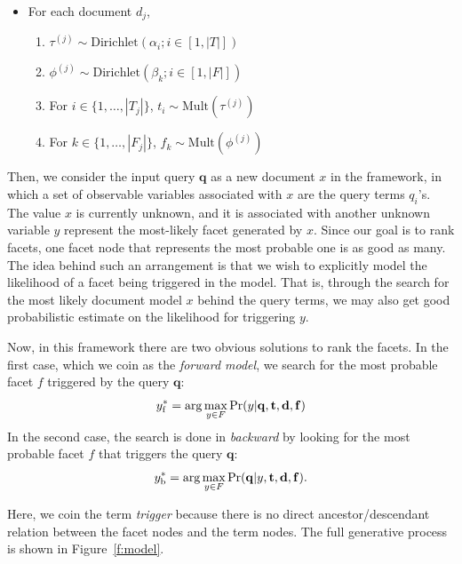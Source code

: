 \begin{itemize} 
  \item For each document $d_j$, \begin{enumerate}
    \item $\tau^{(j)} \sim \textrm{Dirichlet}(\alpha_i; i \in [1, |T|])$
    \item $\phi^{(j)} \sim \textrm{Dirichlet}(\beta_k; i \in [1, |F|])$
    \item For $i \in \{ 1, \ldots, |T_j| \}$, $t_i \sim \textrm{Mult}(\tau^{(j)})$ 
    \item For $k \in \{ 1, \ldots, |F_j| \}$, $f_k \sim \textrm{Mult}(\phi^{(j)})$ 
  \end{enumerate}
\end{itemize}

Then, we consider the input query $\mathbf{q}$ as a new document $x$ in the
framework, in which a set of observable variables associated with $x$ are the
query terms $q_i$'s.  The value $x$ is currently unknown, and it is associated
with another unknown variable $y$ represent the most-likely facet generated by
$x$.  Since our goal is to rank facets, one facet node that represents the most
probable one is as good as many.  The idea behind such an arrangement is that
we wish to explicitly model the likelihood of a facet being triggered in the
model.  That is, through the search for the most likely document model $x$
behind the query terms, we may also get good probabilistic estimate on the
likelihood for triggering $y$.

Now, in this framework there are two obvious solutions to rank the facets.  In
the first case, which we coin as the \emph{forward model}, we search for the
most probable facet $f$ triggered by the query $\mathbf{q}$:
\begin{equation}y^*_{\rm f} = \arg\max_{y \in F} \Pr(y|\mathbf{q}, \mathbf{t},
\mathbf{d}, \mathbf{f}) \label{eq:forward} \end{equation} In the second case,
the search is done in \emph{backward} by looking for the most probable facet
$f$ that triggers the query $\mathbf{q}$:  \begin{equation}y^*_{\rm b} =
\arg\max_{y \in F} \Pr(\mathbf{q}|y, \mathbf{t}, \mathbf{d}, \mathbf{f}).
\label{eq:backward} \end{equation} 

Here, we coin the term \emph{trigger} because there is no direct
ancestor/descendant relation between the facet nodes and the term nodes.  The
full generative process is shown in Figure~\ref{f:model}.  

